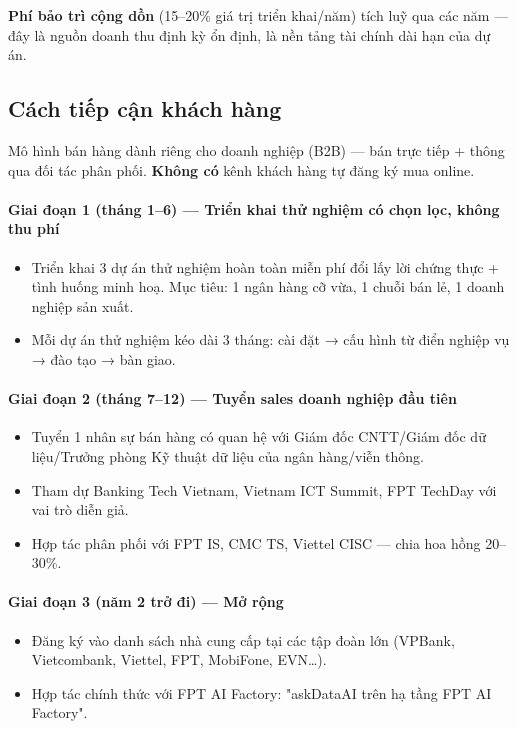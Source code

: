 \documentclass[11pt,a4paper]{article}
\begin{document}
\textbf{Phí bảo trì cộng dồn} (15--20\% giá trị triển khai/năm) tích luỹ qua các năm --- đây là nguồn doanh thu định kỳ ổn định, là nền tảng tài chính dài hạn của dự án.

\subsection{Cách tiếp cận khách hàng}

Mô hình bán hàng dành riêng cho doanh nghiệp (B2B) --- bán trực tiếp + thông qua đối tác phân phối. \textbf{Không có} kênh khách hàng tự đăng ký mua online.

\paragraph{Giai đoạn 1 (tháng 1--6) --- Triển khai thử nghiệm có chọn lọc, không thu phí}
\begin{itemize}
\item Triển khai 3 dự án thử nghiệm hoàn toàn miễn phí đổi lấy lời chứng thực + tình huống minh hoạ. Mục tiêu: 1 ngân hàng cỡ vừa, 1 chuỗi bán lẻ, 1 doanh nghiệp sản xuất.
\item Mỗi dự án thử nghiệm kéo dài 3 tháng: cài đặt → cấu hình từ điển nghiệp vụ → đào tạo → bàn giao.
\end{itemize}

\paragraph{Giai đoạn 2 (tháng 7--12) --- Tuyển sales doanh nghiệp đầu tiên}
\begin{itemize}
\item Tuyển 1 nhân sự bán hàng có quan hệ với Giám đốc CNTT/Giám đốc dữ liệu/Trưởng phòng Kỹ thuật dữ liệu của ngân hàng/viễn thông.
\item Tham dự Banking Tech Vietnam, Vietnam ICT Summit, FPT TechDay với vai trò diễn giả.
\item Hợp tác phân phối với FPT IS, CMC TS, Viettel CISC --- chia hoa hồng 20--30\%.
\end{itemize}

\paragraph{Giai đoạn 3 (năm 2 trở đi) --- Mở rộng}
\begin{itemize}
\item Đăng ký vào danh sách nhà cung cấp tại các tập đoàn lớn (VPBank, Vietcombank, Viettel, FPT, MobiFone, EVN\ldots).
\item Hợp tác chính thức với FPT AI Factory: "askDataAI trên hạ tầng FPT AI Factory".
\end{itemize}
\end{document}
